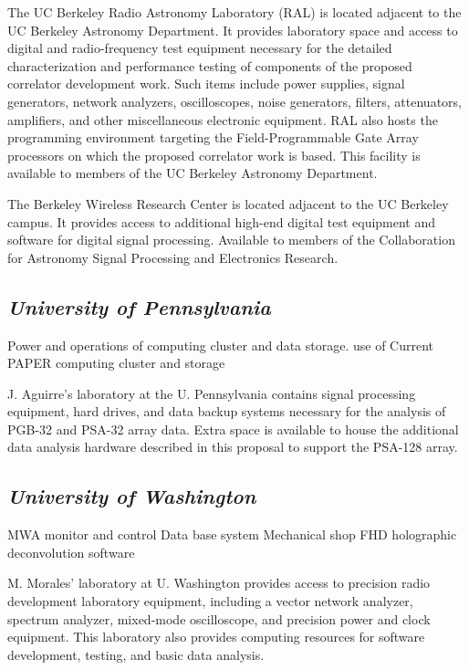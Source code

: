 \documentclass[11pt]{article}
\begin{document}

The UC Berkeley Radio Astronomy Laboratory (RAL) is located adjacent to the UC
Berkeley Astronomy Department. It provides laboratory space and access to
digital and radio-frequency test equipment necessary for the detailed
characterization and performance testing of components of the proposed correlator
development work. Such items include power supplies, signal generators, network
analyzers, oscilloscopes, noise generators, filters, attenuators, amplifiers,
and other miscellaneous electronic equipment. RAL also hosts the programming
environment targeting the Field-Programmable Gate Array processors on which the
proposed correlator work is based. This facility is available to members of the
UC Berkeley Astronomy Department.

The Berkeley Wireless Research Center is located adjacent to the UC Berkeley
campus. It provides access to additional high-end digital test equipment and
software for digital signal processing.  Available to members of the
Collaboration for Astronomy Signal Processing and Electronics Research.

\subsection*{\it University of Pennsylvania}

Power and operations of computing cluster and data storage.
use of Current PAPER computing cluster and storage

J. Aguirre’s laboratory at the U. Pennsylvania contains signal processing
equipment, hard drives, and data backup systems necessary for the analysis of
PGB-32 and PSA-32 array data. Extra space is available to house the additional
data analysis hardware described in this proposal to support the PSA-128 array.


\subsection{\it University of Washington}

MWA monitor and control Data base system
Mechanical shop
FHD holographic deconvolution software

M. Morales' laboratory at U. Washington provides access to precision radio
development laboratory equipment, including
a vector network analyzer, spectrum analyzer, mixed-mode oscilloscope, and
precision power and clock equipment.  This laboratory also provides computing
resources for software development, testing, and basic data analysis.
\end{document}
